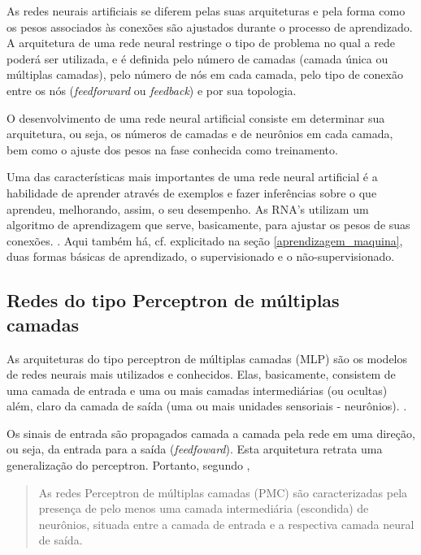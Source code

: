 As  redes  neurais  artificiais  se  diferem  pelas  suas arquiteturas e pela forma como os pesos associados às conexões são ajustados durante o processo de aprendizado.	A arquitetura de uma rede neural restringe o tipo de problema no qual a rede poderá ser utilizada, e é definida pelo  número  de  camadas  (camada única  ou múltiplas camadas), pelo número de nós em cada camada, pelo tipo de conexão entre os nós (\textit{feedforward} ou \textit{feedback}) e por sua topologia. \cite[p. 46-49]{haykin_redes_2001}

O desenvolvimento de uma rede neural artificial consiste em determinar sua arquitetura, ou seja, os números de camadas e de neurônios em cada camada, bem como o ajuste dos pesos na fase conhecida como treinamento.\cite{hagan_neural_1996} \cite{haykin_redes_2001}

Uma das características mais importantes de uma rede neural artificial é a habilidade de aprender através de exemplos e fazer inferências sobre o que aprendeu, melhorando, assim, o seu desempenho. As RNA's utilizam um algoritmo de aprendizagem que serve, basicamente, para ajustar os pesos de suas conexões. \cite{haykin_redes_2001} \cite{ferneda_redes_2006} \cite{lima_ia_2016} \cite{Norvig2013}. Aqui também há, cf. explicitado na seção \ref{aprendizagem_maquina}, duas formas básicas de aprendizado, o supervisionado e o não-supervisionado.

\subsection{Redes do tipo Perceptron de múltiplas camadas}
As arquiteturas do tipo perceptron de múltiplas camadas (MLP) são os modelos de redes neurais mais utilizados e conhecidos. Elas, basicamente, consistem de uma camada de entrada e uma ou mais camadas intermediárias (ou ocultas) além, claro da camada de saída (uma ou mais unidades sensoriais - neurônios). \cite{haykin_redes_2001}.

Os sinais de entrada são propagados camada a camada pela rede em uma direção, ou seja, da entrada para a saída (\textit{feedfoward}). Esta arquitetura retrata uma generalização do perceptron. Portanto, segundo \cite[p. 26]{silva_redes_2016}, \begin{quote}
	As redes Perceptron de múltiplas camadas (PMC) são caracterizadas pela presença de pelo menos uma camada intermediária (escondida) de neurônios, situada entre a camada de entrada e a respectiva camada neural de saída.
\end{quote}

